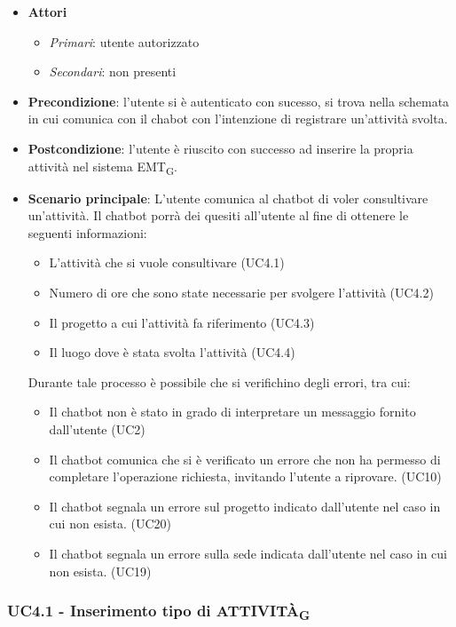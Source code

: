 \begin{itemize}
    \item \textbf{Attori}
    \begin{itemize} 
        \item \textit{Primari}: utente autorizzato
        \item \textit{Secondari}: non presenti
    \end{itemize}
 \item \textbf{Precondizione}: l'utente si è autenticato con sucesso, si trova nella schemata in cui comunica con il chabot con l'intenzione di registrare un'attività svolta. 
 \item \textbf{Postcondizione}: l'utente è riuscito con successo ad inserire la propria attività nel sistema EMT\textsubscript{G}.  
 \item \textbf{Scenario principale}: L'utente comunica al chatbot di voler consultivare un'attività. Il chatbot porrà dei quesiti all'utente al fine di ottenere le seguenti informazioni: 
    \begin{itemize}
        \item L'attività che si vuole consultivare (UC4.1)
        \item Numero di ore che sono state necessarie per svolgere l'attività (UC4.2)
        \item Il progetto a cui l'attività fa riferimento (UC4.3)
        \item Il luogo dove è stata svolta l'attività (UC4.4)
    \end{itemize}
 Durante tale processo è possibile che si verifichino degli errori, tra cui: 
    \begin{itemize}
        \item Il chatbot non è stato in grado di interpretare un messaggio fornito dall'utente (UC2)
        \item Il chatbot comunica che si è verificato un errore che non ha permesso di completare l'operazione richiesta, invitando l'utente a riprovare. (UC10)
        \item Il chatbot segnala un errore sul progetto indicato dall'utente nel caso in cui non esista. (UC20)
        \item Il chatbot segnala un errore sulla sede indicata dall'utente nel caso in cui non esista. (UC19)
    \end{itemize}
\end{itemize}

\newpage

\subsubsection{UC4.1 - Inserimento tipo di ATTIVITÀ\textsubscript{G}}

